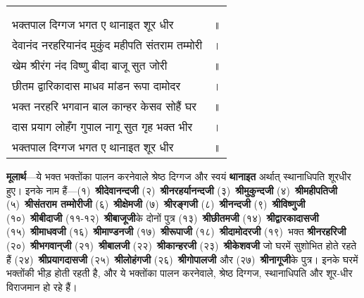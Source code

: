{
{\bfseries
\setlength{\mylenone}{0pt}
\settowidth{\mylentwo}{}
\setlength{\mylenone}{\maxof{\mylenone}{\mylentwo}}
\settowidth{\mylentwo}{भक्तपाल दिग्गज भगत ए थानाइत शूर धीर}
\setlength{\mylenone}{\maxof{\mylenone}{\mylentwo}}
\settowidth{\mylentwo}{देवानंद नरहरियानंद मुकुंद महीपति संतराम तम्मोरी}
\setlength{\mylenone}{\maxof{\mylenone}{\mylentwo}}
\settowidth{\mylentwo}{खेम श्रीरंग नंद विष्णु बीदा बाजू सुत जोरी}
\setlength{\mylenone}{\maxof{\mylenone}{\mylentwo}}
\settowidth{\mylentwo}{छीतम द्वारिकादास माधव मांडन रूपा दामोदर}
\setlength{\mylenone}{\maxof{\mylenone}{\mylentwo}}
\settowidth{\mylentwo}{भक्त नरहरि भगवान बाल कान्हर केसव सोहैं घर}
\setlength{\mylenone}{\maxof{\mylenone}{\mylentwo}}
\settowidth{\mylentwo}{दास प्रयाग लोहँग गुपाल नागू सुत गृह भक्त भीर}
\setlength{\mylenone}{\maxof{\mylenone}{\mylentwo}}
\settowidth{\mylentwo}{भक्तपाल दिग्गज भगत ए थानाइत शूर धीर}
\setlength{\mylenone}{\maxof{\mylenone}{\mylentwo}}
\setlength{\mylentwo}{\baselineskip}
\setlength{\mylenone}{\mylenone + 1pt}
\begin{longtable}[l]{@{\hspace*{\mylen}}>{\setlength\parfillskip{0pt}}p{\mylenone}@{}@{}l@{}}
 & \\[-\the\mylentwo]
\centering{॥ १०० \hspace*{-1.5mm}॥} & \\ \nopagebreak
भक्तपाल दिग्गज भगत ए थानाइत शूर धीर & ॥\\
देवानंद नरहरियानंद मुकुंद महीपति संतराम तम्मोरी & ।\\ \nopagebreak
खेम श्रीरंग नंद विष्णु बीदा बाजू सुत जोरी & ॥\\
छीतम द्वारिकादास माधव मांडन रूपा दामोदर & ।\\ \nopagebreak
भक्त नरहरि भगवान बाल कान्हर केसव सोहैं घर & ॥\\
दास प्रयाग लोहँग गुपाल नागू सुत गृह भक्त भीर & ।\\ \nopagebreak
भक्तपाल दिग्गज भगत ए थानाइत शूर धीर & ॥
\end{longtable}
}
}
\begin{sloppypar}\justifying{}
\textbf{मूलार्थ}—ये भक्त भक्तोंका पालन करनेवाले श्रेष्ठ दिग्गज और स्वयं \textbf{थानाइत} अर्थात् स्थानाधिपति शूरधीर हुए। इनके नाम हैं—(१)~\textbf{श्रीदेवानन्दजी} (२)~\textbf{श्रीनरहर्यानन्दजी} (३)~\textbf{श्रीमुकुन्दजी} (४)~\textbf{श्रीमहीपतिजी} (५)~\textbf{श्रीसंतराम तम्मोरीजी} (६)~\textbf{श्रीक्षेमजी} (७)~\textbf{श्रीरङ्गजी} (८)~\textbf{श्रीनन्दजी} (९)~\textbf{श्रीविष्णुजी} (१०)~\textbf{श्रीबीदाजी} (११-१२)~\textbf{श्रीबाजूजी}के दोनों पुत्र (१३)~\textbf{श्रीछीतमजी} (१४)~\textbf{श्रीद्वारकादासजी} (१५)~\textbf{श्रीमाधवजी} (१६)~\textbf{श्रीमाण्डनजी} (१७)~\textbf{श्रीरूपाजी} (१८)~\textbf{श्रीदामोदरजी} (१९)~भक्त \textbf{श्रीनरहरिजी} (२०)~\textbf{श्रीभगवान्‌जी} (२१)~\textbf{श्रीबालजी} (२२)~\textbf{श्रीकान्हरजी} (२३)~\textbf{श्रीकेशवजी} जो घरमें सुशोभित होते रहते हैं (२४)~\textbf{श्रीप्रयागदासजी} (२५)~\textbf{श्रीलोहंगजी} (२६)~\textbf{श्रीगोपालजी} और (२७)~\textbf{श्रीनागूजी}के पुत्र। इनके घरमें भक्तोंकी भीड़ होती रहती है, और ये भक्तोंका पालन करनेवाले, श्रेष्ठ दिग्गज, स्थानाधिपति और शूर-धीर विराजमान हो रहे हैं।
\end{sloppypar}

